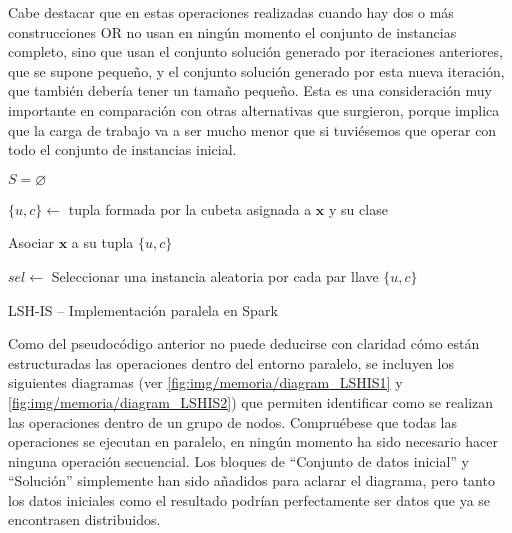 Cabe destacar que en estas operaciones realizadas cuando hay dos o más construcciones OR no usan en ningún momento el conjunto de instancias completo, sino que usan el conjunto solución generado por iteraciones anteriores, que se supone pequeño, y el conjunto solución generado por esta nueva iteración, que también debería tener un tamaño pequeño. Esta es una consideración muy importante en comparación con otras alternativas que surgieron, porque implica que la carga de trabajo va a ser mucho menor que si tuviésemos que operar con todo el conjunto de instancias inicial.


\begin{algorithm*}
\DontPrintSemicolon
{}

$ S = \varnothing $

 {

   {
        $\{u,c\}\leftarrow$ tupla formada por la cubeta asignada a $\mathbf{x}$ y su clase

        Asociar $\mathbf{x}$ a su tupla $\{u,c\}$
    }

    $sel\leftarrow$ Seleccionar una instancia aleatoria por cada par llave $\{u,c\}$


}

\caption{LSH-IS -- Implementación paralela en Spark}
\label{alg:LSHISSPARK}
\end{algorithm*}

Como del pseudocódigo anterior no puede deducirse con claridad cómo están estructuradas las operaciones dentro del entorno paralelo, se incluyen los siguientes diagramas (ver \ref{fig:img/memoria/diagram_LSHIS1} y \ref{fig:img/memoria/diagram_LSHIS2}) que permiten identificar como se realizan las operaciones dentro de un grupo de nodos. Compruébese que todas las operaciones se ejecutan en paralelo, en ningún momento ha sido necesario hacer ninguna operación secuencial. Los bloques de ``Conjunto de datos inicial'' y ``Solución'' simplemente han sido añadidos para aclarar el diagrama, pero tanto los datos iniciales como el resultado podrían perfectamente ser datos que ya se encontrasen distribuidos.

